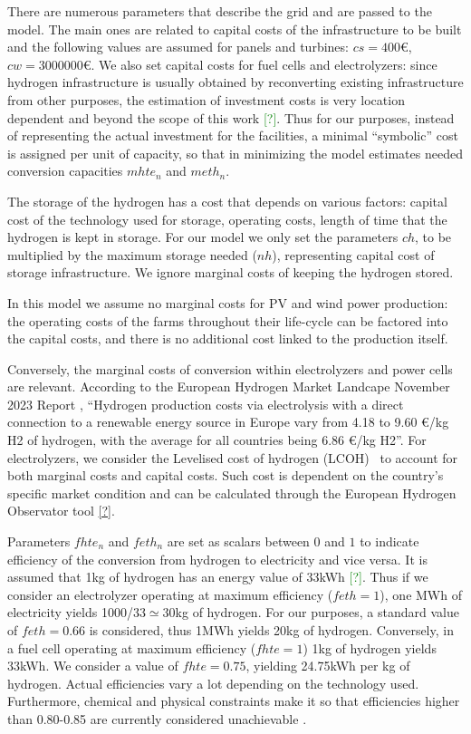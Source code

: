 There are numerous parameters that describe the grid and are passed to the model. 
The main ones are related to capital costs of the infrastructure to be built and the following values are assumed for panels and turbines: $cs = 400$\euro, $cw = 3 000 000$\euro. 
We also set capital costs for fuel cells and electrolyzers: since hydrogen infrastructure is usually obtained by reconverting existing infrastructure from other purposes, the estimation of investment costs is very location dependent and beyond the scope of this work \textcolor{green}{[?]}. 
Thus for our purposes, instead of representing the actual investment for the facilities, a minimal ``symbolic'' cost is assigned per unit of capacity, so that in minimizing the model estimates needed conversion capacities $mhte_n$ and $meth_n$.

The storage of the hydrogen has a cost that depends on various factors: capital cost of the technology used for storage, operating costs, length of time that the hydrogen is kept in storage.
For our model we only set the parameters $ch$, to be multiplied by the maximum storage needed ($nh$), representing capital cost of storage infrastructure. 
We ignore marginal costs of keeping the hydrogen stored.

In this model we assume no marginal costs for PV and wind power production: the operating costs of the farms throughout their life-cycle can be factored into the capital costs, and there is no additional cost linked to the production itself.

Conversely, the marginal costs of conversion within electrolyzers and power cells are relevant. 
According to the European Hydrogen Market Landcape November 2023 Report \textcolor{green}{\cite{European_H2_Market_landscape}}, ``Hydrogen production costs via electrolysis with a direct connection to a renewable energy source in Europe vary from 4.18 to 9.60 €/kg H2 of hydrogen, with the average for all countries being 6.86 €/kg H2''. 
For electrolyzers, we consider the Levelised cost of hydrogen (LCOH)  to account for both marginal costs and capital costs. 
Such cost is dependent on the country's specific market condition and can be calculated through the European Hydrogen Observator tool \textcolor{green}{\href{https://observatory.clean-hydrogen.europa.eu/tools-reports/levelised-cost-hydrogen-calculator}{[?]}}.

Parameters $fhte_n$ and $feth_n$ are set as scalars between $0$ and $1$ to indicate efficiency of the conversion from hydrogen to electricity and vice versa. 
It is assumed that 1kg of hydrogen has an energy value of 33kWh \textcolor{green}{[?]}. 
Thus if we consider an electrolyzer operating at maximum efficiency ($feth=1$), one MWh of electricity yields 1000/33$\simeq$30kg of hydrogen. 
For our purposes, a standard value of $feth=0.66$ is considered, thus 1MWh yields 20kg of hydrogen. 
Conversely, in a fuel cell operating at maximum efficiency ($fhte=1$) 1kg of hydrogen yields 33kWh. 
We consider a value of $fhte=0.75$, yielding 24.75kWh per kg of hydrogen. Actual efficiencies vary a lot depending on the technology used. 
Furthermore, chemical and physical constraints make it so that efficiencies higher than 0.80-0.85 are currently considered unachievable \cite{DAWOOD}.

